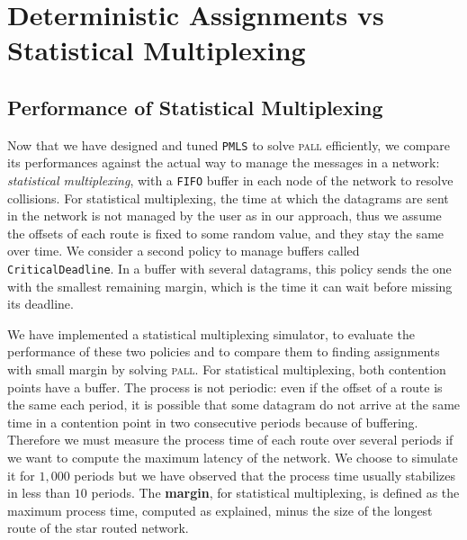 \documentclass[a4paper,10pt]{journal}
\newcommand\PMLS{\texttt{PMLS}\xspace}
\newcommand\FIFO{\texttt{FIFO}\xspace}
\newcommand\critdead{\texttt{CriticalDeadline}\xspace}
\newcommand\pall{\textsc{pall}\xspace}
\begin{document}
\section{Deterministic Assignments vs Statistical Multiplexing}\label{sec:comparison}

    \subsection{Performance of Statistical Multiplexing}


      Now that we have designed and tuned \PMLS to solve \pall efficiently, we compare its performances against the actual way to manage the messages in a network:  \emph{statistical multiplexing}, with a \FIFO buffer in each node of the network to resolve collisions. For statistical multiplexing, the time at which the datagrams are sent in the network is not managed by the user as in our approach, thus we assume the offsets of each route is fixed to some random value, and they stay the same over time.
      We consider a second policy to manage buffers called \critdead. In a buffer with several datagrams, this policy sends the one with the smallest remaining margin, which is the time it can wait before missing its deadline.


    We have implemented a statistical multiplexing simulator, to evaluate the performance of these two policies and to compare them to finding assignments with small margin by solving \pall. 
    For statistical multiplexing, both contention points have a buffer. The process is not periodic:
    even if the offset of a route is the same each period, it is possible that some datagram do not arrive at the same time in a contention point in two consecutive periods because of buffering. Therefore we must measure the process time of each route over several periods if we want to compute the maximum latency of the network. We choose to simulate it for $1,000$ periods but we have observed that the process time usually stabilizes in less than $10$ periods. The \textbf{margin}, for statistical multiplexing, is defined as the maximum process time, computed as explained, minus the size of the longest route of the star routed network. 

\end{document}
